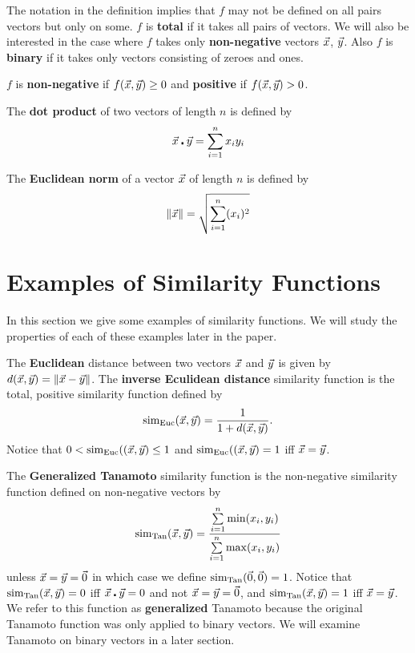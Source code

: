 \documentclass{article}
\newcommand{\skipsmall}{\vspace{1em}}
\begin{document}
\skipsmall

The notation in the definition implies that $f$ may not be defined on all pairs 
vectors but only on some.  $f$ is
\textbf{total} if it takes all pairs of vectors. We will also be interested in
the case where $f$ takes only \textbf{non-negative} vectors $\vec{x}$, $\vec{y}$. Also $f$
is \textbf{binary} if it takes only vectors consisting of zeroes and ones.

\skipsmall

$f$ is \textbf{non-negative} if
$f(\vec{x},\vec{y})\geq 0$ and \textbf{positive} if $f(\vec{x},\vec{y})> 0$. 

\skipsmall

The \textbf{dot product} of two vectors of length $n$ is defined by
\begin{equation}
\vec{x}\centerdot\vec{y}=\sum\limits_{i=1}^{n}x_i y_i
\end{equation}

\skipsmall

The \textbf{Euclidean norm} of a vector $\vec{x}$ of length $n$ is defined by
\begin{equation}
\|\vec{x}\| = \sqrt{\sum\limits_{i=1}^n (x_i)^2}
\end{equation}

\section{Examples of Similarity Functions}
In this section we give some examples of  similarity functions. We will study the
properties of each of these examples later in the paper.

\begin{example}
The \textbf{Euclidean} distance between two vectors $\vec{x}$ and $\vec{y}$ is given by
$d(\vec{x},\vec{y})=\|\vec{x}-\vec{y}\|$. The \textbf{inverse Eculidean
distance} similarity function is the total, positive similarity function defined
by 
\begin{equation}
\operatorname{sim_{Euc}}(\vec{x},\vec{y})=\frac{1}{1+d(\vec{x},\vec{y})}.
\end{equation} 
Notice that $0<\operatorname{sim_{Euc}}((\vec{x},\vec{y})\leq 1$ and
$\operatorname{sim_{Euc}}((\vec{x},\vec{y})=1$ iff $\vec{x}=\vec{y}$.
\end{example}



\begin{example}
The \textbf{Generalized Tanamoto} similarity function is the
non-negative similarity function defined on non-negative vectors by 
\begin{equation}
\operatorname{sim_{Tan}}(\vec{x},\vec{y})=\frac{\sum\limits_{i=1}^{n}\min(x_i,y_i)}{\sum\limits_{i=1}^{n}\max(x_i,y_i)}
\end{equation}
unless $\vec{x}=\vec{y}=\vec{0}$ in which case we define $\operatorname{sim_{Tan}}(\vec{0},\vec{0})=1$.
Notice that $\operatorname{sim_{Tan}}(\vec{x},\vec{y})=0$ iff
$\vec{x}\centerdot\vec{y}=0$ and not $\vec{x}=\vec{y}=\vec{0}$,
and $\operatorname{sim_{Tan}}(\vec{x},\vec{y})=1$ iff $\vec{x}=\vec{y}$. We refer to this function as
\textbf{generalized} Tanamoto because the original Tanamoto function was only
applied to binary vectors. We will examine Tanamoto on binary vectors in a later
section.
\end{example}
\end{document}
